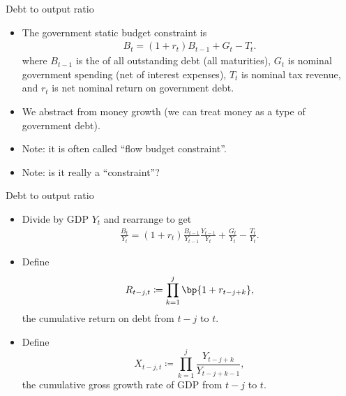 \documentclass[11pt,xcolor={dvipsnames},aspectratio=159,hyperref={pdftex,pdfpagemode=UseNone,hidelinks,pdfdisplaydoctitle=true},usepdftitle=false]{beamer}
\begin{document}
\begin{frame}{Debt to output ratio}

    \begin{itemize}
        \item The government static budget constraint is 
        \begin{align*}
            B_{t} = (1+r_{t})B_{t-1} + G_t - T_t.
        \end{align*}
        where $B_{t-1}$ is the  of all outstanding debt (all maturities), $G_t$ is nominal government spending (net of interest expenses), $T_t$ is nominal tax revenue, and $r_t$ is net nominal return on government debt.
        \item We abstract from money growth (we can treat money as a type of government debt).
        \item Note: it is often called ``flow budget constraint''. 
        \item Note: is it really a ``constraint''?
    \end{itemize}
\end{frame}
\begin{frame}{Debt to output ratio}

    \begin{itemize}
        \item Divide by  GDP $Y_t$ and rearrange  to get
        \begin{align*}
            \frac{B_{t}}{Y_t} = (1+r_{t})\frac{B_{t-1}}{Y_{t-1}}\frac{Y_{t-1}}{Y_t} + \frac{G_t}{Y_t} - \frac{T_t}{Y_t}.
        \end{align*}
        \item Define $$R_{t-j,t} \coloneq \prod_{k=1}^{j} \bp{1+r_{t-j+k}},$$ the cumulative return on debt from $t-j$ to $t$.
        \item Define $$X_{t-j,t} \coloneq \prod_{k=1}^{j} \frac{Y_{t-j+k}}{Y_{t-j+k-1}},$$ the cumulative gross growth rate of GDP from $t-j$ to $t$.
        
    \end{itemize}
\end{frame}
\end{document}
